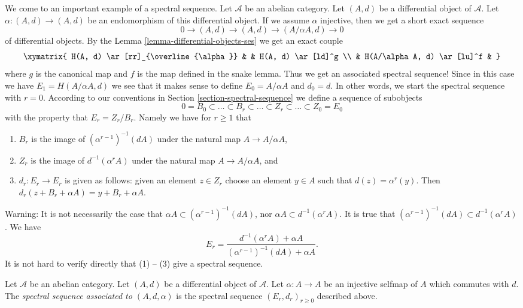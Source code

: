 \noindent
We come to an important example of a spectral sequence.
Let $\mathcal{A}$ be an abelian category.
Let $(A, d)$ be a differential object of $\mathcal{A}$.
Let $\alpha : (A, d) \to (A, d)$ be an endomorphism of this differential
object. If we assume $\alpha$ injective, then we get a short exact sequence
$$
0 \to (A, d) \to (A, d) \to (A/\alpha A, d) \to 0
$$
of differential objects. By the
Lemma \ref{lemma-differential-objects-ses} we get an exact couple
$$
\xymatrix{
H(A, d) \ar[rr]_{\overline{\alpha}} & & H(A, d) \ar[ld]^g \\
& H(A/\alpha A, d) \ar[lu]^f &
}
$$
where $g$ is the canonical map and $f$ is the map defined in the snake lemma.
Thus we get an associated spectral sequence!
Since in this case we have $E_1 = H(A/\alpha A, d)$ we
see that it makes sense to define $E_0 = A/\alpha A$
and $d_0 = d$. In other words, we start the spectral sequence
with $r = 0$. According to our conventions in
Section \ref{section-spectral-sequence} we define a sequence of subobjects
$$
0 = B_0 \subset \ldots \subset B_r \subset \ldots
\subset Z_r \subset \ldots \subset Z_0 = E_0
$$
with the property that $E_r = Z_r/B_r$. Namely we have
for $r \geq 1$ that
\begin{enumerate}
\item $B_r$ is the image of $(\alpha^{r - 1})^{-1}(d A)$
under the natural map $A \to A/\alpha A$,
\item $Z_r$ is the image of $d^{-1}(\alpha^r A)$
under the natural map $A \to A/\alpha A$, and
\item $d_r : E_r \to E_r$ is given as follows: given an element $z \in Z_r$
choose an element $y \in A$ such that $d(z) = \alpha^r(y)$. Then
$d_r(z + B_r + \alpha A) = y + B_r + \alpha A$.
\end{enumerate}
Warning: It is not necessarily the case that
$\alpha A \subset (\alpha^{r - 1})^{-1}(dA)$, nor
$\alpha A \subset d^{-1}(\alpha^r A)$. It is true that
$(\alpha^{r - 1})^{-1}(dA) \subset d^{-1}(\alpha^r A)$.
We have
$$
E_r
=
\frac{d^{-1}(\alpha^r A) + \alpha A}{(\alpha^{r - 1})^{-1}(dA) + \alpha A}.
$$
It is not hard to verify directly that (1) -- (3) give a spectral sequence.

\begin{definition}
\label{definition-differential-object-selfmap}
Let $\mathcal{A}$ be an abelian category.
Let $(A, d)$ be a differential object of $\mathcal{A}$.
Let $\alpha : A \to A$ be an injective selfmap of $A$ which
commutes with $d$. The {\it spectral sequence associated to
$(A, d, \alpha)$} is the spectral sequence
$(E_r, d_r)_{r \geq 0}$ described above.
\end{definition}

















